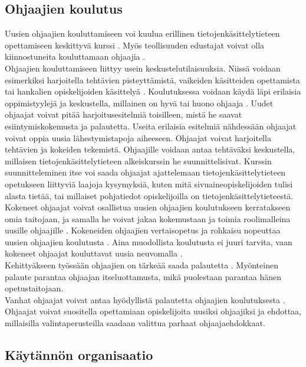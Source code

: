 \documentclass[finnish]{tktltiki2}
\theoremstyle{definition}
\theoremstyle{remark}
\begin{document}
\subsection{Ohjaajien koulutus}

Uusien ohjaajien kouluttamiseen voi kuulua erillinen tietojenkäsittelytieteen opettamiseen keskittyvä kurssi \cite{Reges88, Roberts95}.  Myös teollisuuden edustajat voivat olla kiinnostuneita kouluttamaan ohjaajia \cite{Morgan02}.
\\
Ohjaajien kouluttamiseen liittyy usein keskustelutilaisuuksia. Niissä voidaan esimerkiksi harjoitella tehtävien pisteyttämistä, vaikeiden käsitteiden opettamista tai hankalien opiskelijoiden käsittelyä \cite{Reges03}. Koulutuksessa voidaan käydä läpi erilaisia oppimistyylejä ja keskustella, millainen on hyvä tai huono ohjaaja \cite{Kay95}. Uudet ohjaajat voivat pitää harjoitusesitelmiä toisilleen, mistä he saavat esiintymiskokemusta ja palautetta. Useita erilaisia esitelmiä nähdessään ohjaajat voivat oppia uusia lähestymistapoja aiheeseen. Ohjaajat voivat harjoitella tehtävien ja kokeiden tekemistä. Ohjaajille voidaan antaa tehtäväksi keskustella, millaisen tie\-to\-jen\-kä\-sit\-te\-ly\-tie\-teen alkeiskurssin he suunnittelisivat. Kurssin suunnitteleminen itse voi saada ohjaajat ajattelemaan tietojenkäsittelytieteen opetukseen liittyviä laajoja kysymyksiä, kuten mitä sivuaineopiskelijoiden tulisi alasta tietää, tai millaiset pohjatiedot opiskelijoilla on tietojenkäsittelytieteestä. 
\\
Kokeneet ohjaajat voivat osallistua uusien ohjaajien koulutukseen kerratakseen omia taitojaan, ja samalla he voivat jakaa kokemustaan ja toimia roolimalleina uusille ohjaajille \cite{Reges88}. Kokeneiden ohjaajien vertaisopetus ja rohkaisu nopeuttaa uusien ohjaajien koulutusta \cite{Decker06}. Aina muodollista koulutusta ei juuri tarvita, vaan kokeneet ohjaajat kouluttavat uusia neuvomalla \cite{Kurhila11}.
\\
Kehittyäkseen työssään ohjaajien on tärkeää saada palautetta \cite{Patitsas12}. Myönteinen palaute parantaa ohjaajan itseluottamusta, mikä puolestaan parantaa hänen opetustaitojaan.
\\
Vanhat ohjaajat voivat antaa hyödyllistä palautetta ohjaajien koulutuksesta \cite{Decker06}. Ohjaajat voivat suositella opettamiaan opiskelijoita uusiksi ohjaajiksi ja ehdottaa, millaisilla valintaperusteilla saadaan valittua parhaat ohjaajaehdokkaat. 



\subsection{Käytännön organisaatio}
\end{document}
